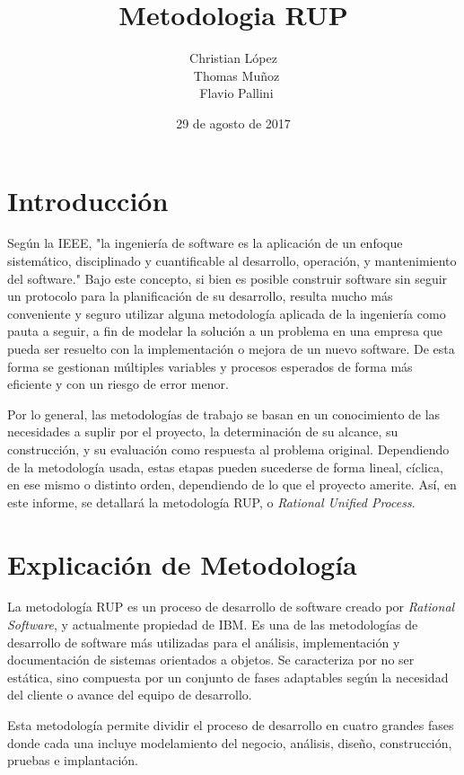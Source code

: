 \documentclass[spanish]{udpreport}
\title{Metodologia RUP}
\author{Christian López \\ Thomas Muñoz \\ Flavio Pallini}
\date{29 de agosto de 2017}
\begin{document}
\maketitle

\tableofcontents
\listoffigures

\chapter{Introducción}
Según la IEEE, "la ingeniería de software es la aplicación de un enfoque sistemático, disciplinado y cuantificable al desarrollo, operación, y mantenimiento del software." Bajo este concepto, si bien es posible construir software sin seguir un protocolo para la planificación de su desarrollo, resulta mucho más conveniente y seguro utilizar alguna metodología aplicada de la ingeniería como pauta a seguir, a fin de modelar la solución a un problema en una empresa que pueda ser resuelto con la implementación o mejora de un nuevo software. De esta forma se gestionan múltiples variables y procesos esperados de forma más eficiente y con un riesgo de error menor. \par
Por lo general, las metodologías de trabajo se basan en un conocimiento de las necesidades a suplir por el proyecto, la determinación de su alcance, su construcción, y su evaluación como respuesta al problema original. Dependiendo de la metodología usada, estas etapas pueden sucederse de forma lineal, cíclica, en ese mismo o distinto orden, dependiendo de lo que el proyecto amerite. Así, en este informe, se detallará la metodología RUP, o \textit{Rational Unified Process}.

\chapter{Explicación de Metodología}
La metodología RUP es un proceso de desarrollo de software creado por \textit{Rational Software}, y actualmente propiedad de IBM. Es una de las metodologías de desarrollo de software más utilizadas para el análisis, implementación y documentación de sistemas orientados a objetos. Se caracteriza por no ser estática, sino compuesta por un conjunto de fases adaptables según la necesidad del cliente o avance del equipo de desarrollo.\par
Esta metodología permite dividir el proceso de desarrollo en cuatro grandes fases donde cada una incluye modelamiento del negocio, análisis, diseño, construcción, pruebas e implantación.
\end{document}
